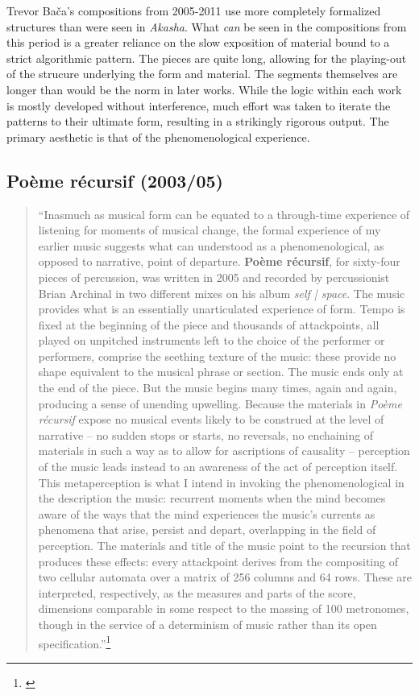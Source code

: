 Trevor Bača's compositions from 2005-2011 use more completely formalized structures than were seen in \textit{Akasha}. What \emph{can} be seen in the compositions from this period is a greater reliance on the slow exposition of material bound to a strict algorithmic pattern. The pieces are quite long, allowing for the playing-out of the strucure underlying the form and material. The segments themselves are longer than would be the norm in later works. While the logic within each work is mostly developed without interference, much effort was taken to iterate the patterns to their ultimate form, resulting in a strikingly rigorous output. The primary aesthetic is that of the phenomenological experience.

\subsection{Po\`eme r\'ecursif (2003/05)}

\begin{quote}
\singlespacing
``Inasmuch as musical form can be equated to a through-time experience of listening for moments of musical change, the formal experience of my earlier music suggests what can understood as a phenomenological, as opposed to narrative, point of departure. \textbf{Po\`eme r\'ecursif}, for sixty-four pieces of percussion, was written in 2005 and recorded by percussionist Brian Archinal in two different mixes on his album \textit{self | space}. The music provides what is an essentially unarticulated experience of form. Tempo is fixed at the beginning of the piece and thousands of attackpoints, all played on unpitched instruments left to the choice of the performer or performers, comprise the seething texture of the music: these provide no shape equivalent to the musical phrase or section. The music ends only at the end of the piece. But the music begins many times, again and again, producing a sense of unending upwelling. Because the materials in \textit{Poème récursif} expose no musical events likely to be construed at the level of narrative -- no sudden stops or starts, no reversals, no enchaining of materials in such a way as to allow for ascriptions of causality -- perception of the music leads instead to an awareness of the act of perception itself. This metaperception is what I intend in invoking the phenomenological in the description the music: recurrent moments when the mind becomes aware of the ways that the mind experiences the music’s currents as phenomena that arise, persist and depart, overlapping in the field of perception. The materials and title of the music point to the recursion that produces these effects: every attackpoint derives from the compositing of two cellular automata over a matrix of 256 columns and 64 rows. These are interpreted, respectively, as the measures and parts of the score, dimensions comparable in some respect to the massing of 100 metronomes, though in the service of a determinism of music rather than its open specification.''\footnote{\citet{baca-dissertation}}
\end{quote}

